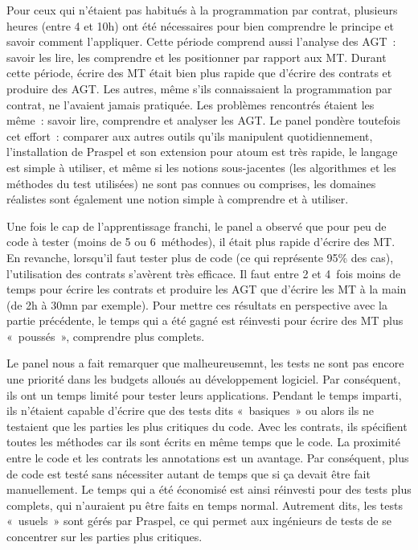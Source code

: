 Pour ceux qui n'étaient pas habitués à la programmation par contrat, plusieurs
heures (entre 4 et 10h) ont été nécessaires pour bien comprendre le principe et
savoir comment l'appliquer. Cette période comprend aussi l'analyse des AGT~:
savoir les lire, les comprendre et les positionner par rapport aux MT. Durant
cette période, écrire des MT était bien plus rapide que d'écrire des contrats et
produire des AGT. Les autres, même s'ils connaissaient la programmation par
contrat, ne l'avaient jamais pratiquée. Les problèmes rencontrés étaient les
même~: savoir lire, comprendre et analyser les AGT. Le panel pondère toutefois
cet effort~: comparer aux autres outils qu'ils manipulent quotidiennement,
l'installation de Praspel et son extension pour atoum est très rapide, le
langage est simple à utiliser, et même si les notions sous-jacentes (les
algorithmes et les méthodes du test utilisées) ne sont pas connues ou comprises,
les domaines réalistes sont également une notion simple à comprendre et à
utiliser.

Une fois le cap de l'apprentissage franchi, le panel a observé que pour peu de
code à tester (moins de 5 ou 6~méthodes), il était plus rapide d'écrire des MT.
En revanche, lorsqu'il faut tester plus de code (ce qui représente 95\% des
cas), l'utilisation des contrats s'avèrent très efficace. Il faut entre 2 et
4~fois moins de temps pour écrire les contrats et produire les AGT que d'écrire
les MT à la main (de 2h à 30mn par exemple). Pour mettre ces résultats en
perspective avec la partie précédente, le temps qui a été gagné est réinvesti
pour écrire des MT plus «~poussés~», comprendre plus complets.

Le panel nous a fait remarquer que malheureusemnt, les tests ne sont pas encore
une priorité dans les budgets alloués au développement logiciel. Par conséquent,
ils ont un temps limité pour tester leurs applications. Pendant le temps
imparti, ils n'étaient capable d'écrire que des tests dits «~basiques~» ou alors
ils ne testaient que les parties les plus critiques du code. Avec les contrats,
ils spécifient toutes les méthodes car ils sont écrits en même temps que le
code. La proximité entre le code et les contrats \via les annotations est un
avantage. Par conséquent, plus de code est testé sans nécessiter autant de
temps que si ça devait être fait manuellement. Le temps qui a été économisé est
ainsi réinvesti pour des tests plus complets, qui n'auraient pu être faits en
temps normal. Autrement dits, les tests «~usuels~» sont gérés par Praspel, ce
qui permet aux ingénieurs de tests de se concentrer sur les parties plus
critiques.

